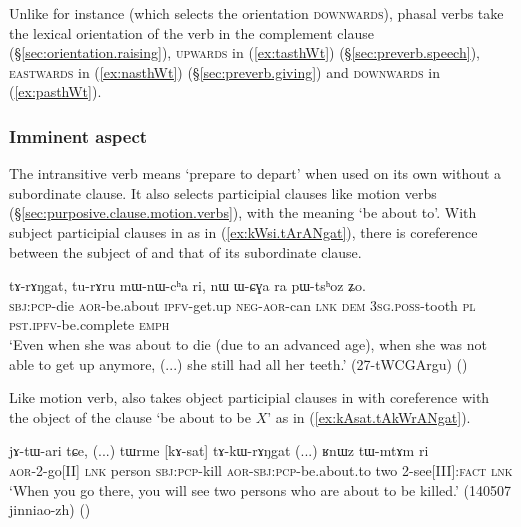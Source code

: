 Unlike  for instance (which selects the orientation \textsc{downwards}), phasal verbs take the lexical orientation of the verb in the complement clause (§\ref{sec:orientation.raising}), \textsc{upwards} in (\ref{ex:tasthWt}) (§\ref{sec:preverb.speech}), \textsc{eastwards} in (\ref{ex:nasthWt}) (§\ref{sec:preverb.giving}) and \textsc{downwards} in (\ref{ex:pasthWt}).

\subsubsection{Imminent aspect} \label{sec:imminent.complements}
The intransitive verb  means `prepare to depart' when used on its own without a subordinate clause. It also selects participial clauses like motion verbs (§\ref{sec:purposive.clause.motion.verbs}), with the meaning `be about to'. With subject participial clauses in  as in (\ref{ex:kWsi.tArANgat}), there is coreference between the subject of  and that of its subordinate clause.


\begin{exe}
\ex \label{ex:kWsi.tArANgat}
 \gll [kɯ-si] tɤ-rɤŋgat, tu-rɤru mɯ-nɯ-cʰa ri, { } nɯ ɯ-ɕɣa ra pɯ-tsʰoz ʑo. \\
 \textsc{sbj}:\textsc{pcp}-die \textsc{aor}-be.about \textsc{ipfv}-get.up \textsc{neg}-\textsc{aor}-can \textsc{lnk} {  } \textsc{dem} \textsc{3sg}.\textsc{poss}-tooth \textsc{pl} \textsc{pst}.\textsc{ipfv}-be.complete \textsc{emph} \\
 \glt `Even when she was about to die (due to an advanced age), when she was not able to get up anymore, (...) she still had all her teeth.' (27-tWCGArgu)
()
\end{exe}

Like motion verb,  also takes object participial clauses in  with coreference with the object of the clause `be about to be $X$' as in (\ref{ex:kAsat.tAkWrANgat}).

\begin{exe}
\ex \label{ex:kAsat.tAkWrANgat}
 \gll jɤ-tɯ-ari tɕe, (...)  tɯrme [kɤ-sat] tɤ-kɯ-rɤŋgat (...) ʁnɯz tɯ-mtɤm ri \\
 \textsc{aor}-2-go[II] \textsc{lnk} {  } person \textsc{sbj}:\textsc{pcp}-kill \textsc{aor}-\textsc{sbj}:\textsc{pcp}-be.about.to {  } two 2-see[III]:\textsc{fact} \textsc{lnk} \\
 \glt `When you go there, you will see two persons who are about to be killed.' (140507 jinniao-zh)
()
\end{exe} 

